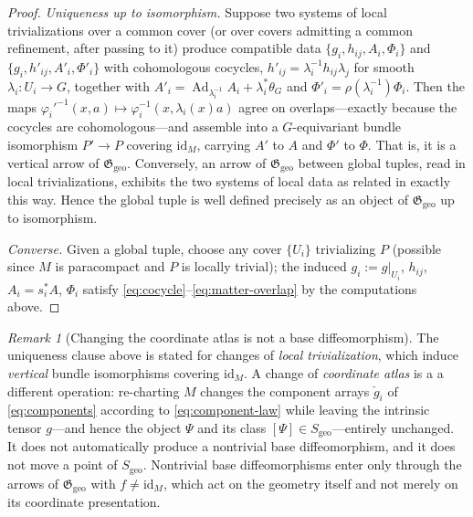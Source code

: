 \documentclass[11pt,a4paper]{article}
\theoremstyle{plain}
\theoremstyle{definition}
\theoremstyle{remark}
\newtheorem{remark}[theorem]{Remark}
\newcommand{\Ggeo}{\mathfrak{G}_{\mathrm{geo}}}
\newcommand{\Sgeo}{S_{\mathrm{geo}}}
\newcommand{\Ad}{\operatorname{Ad}}
\newcommand{\id}{\mathrm{id}}
\begin{document}
\begin{proof}
\emph{Uniqueness up to isomorphism.}
Suppose two systems of local trivializations over a common cover (or over covers admitting a
common refinement, after passing to it) produce compatible data $\{g_i,h_{ij},A_i,\Phi_i\}$ and
$\{g_i,h'_{ij},A'_i,\Phi'_i\}$ with cohomologous cocycles,
$h'_{ij}=\lambda_i^{-1}h_{ij}\lambda_j$ for smooth $\lambda_i\colon U_i\to G$, together with
$A'_i=\Ad_{\lambda_i^{-1}}A_i+\lambda_i^*\theta_G$ and $\Phi'_i=\rho(\lambda_i^{-1})\Phi_i$. Then
the maps $\varphi_i'^{-1}(x,a)\mapsto\varphi_i^{-1}(x,\lambda_i(x)a)$ agree on overlaps---exactly
because the cocycles are cohomologous---and assemble into a $G$-equivariant bundle isomorphism
$P'\to P$ covering $\id_M$, carrying $A'$ to $A$ and $\Phi'$ to $\Phi$. That is, it is a vertical
arrow of $\Ggeo$. Conversely, an arrow of $\Ggeo$ between global tuples, read in local
trivializations, exhibits the two systems of local data as related in exactly this way. Hence the
global tuple is well defined precisely as an object of $\Ggeo$ up to isomorphism.

\emph{Converse.}
Given a global tuple, choose any cover $\{U_i\}$ trivializing $P$ (possible since $M$ is
paracompact and $P$ is locally trivial); the induced $g_i:=g|_{U_i}$, $h_{ij}$, $A_i=s_i^*A$,
$\Phi_i$ satisfy \eqref{eq:cocycle}--\eqref{eq:matter-overlap} by the computations above.
\end{proof}

\begin{remark}[Changing the coordinate atlas is not a base diffeomorphism]
\label{rem:atlas}
The uniqueness clause above is stated for changes of \emph{local trivialization}, which induce
\emph{vertical} bundle isomorphisms covering $\id_M$. A change of \emph{coordinate atlas} is a
a different operation: re-charting $M$ changes the component arrays
$\check g_i$ of \eqref{eq:components} according to \eqref{eq:component-law} while leaving the
intrinsic tensor $g$---and hence the object $\Psi$ and its class $[\Psi]\in\Sgeo$---entirely
unchanged. It does not automatically produce a nontrivial base diffeomorphism, and it does not
move a point of $\Sgeo$. Nontrivial base diffeomorphisms enter only through the arrows of $\Ggeo$
with $f\neq\id_M$, which act on the geometry itself and not merely on its coordinate presentation.
\end{remark}
\end{document}
